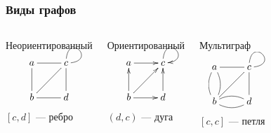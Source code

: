\begin{frame}
    \frametitle{Виды графов}
    \begin{columns}
            \begin{block}{Неориентированный}
                \[
                    {\xymatrix{
                        a \ar@{-}[r] \ar@{-}[d]
                            &c \ar@{-}[d] \ar@{-}@(u,r)[]
                                \\
                        b \ar@{-}[ur] \ar@{-}[r]
                            &d
                    }}
                \]
                $[c,d]$ --- \alert{ребро}
            \end{block}
        
            \begin{block}{Ориентированный}
                \[
                    {\xymatrix{
                        a \ar@{->}[r]
                            &c \ar@{->}@(u,r)[]
                                \\
                        b  \ar@{->}[u] \ar@{->}[ur] \ar@{->}[r]
                            &d \ar@{->}[u]
                    }}
                \]
                $(d,c)$ --- \alert{дуга}
            \end{block}
            \begin{block}{Мультиграф}
            
                \[
                    {\xymatrix{
                        a \ar@{-}[r] \ar@{-}@/^/[d]
                            &c \ar@{-}[d] \ar@{-}@(u,r)[]
                                \\
                        b \ar@{-}[ur] \ar@{-}@/^/[r] \ar@{-}@/^/[u]
                            &d \ar@{-}@/^/[l]
                    }}
                \]
                $[c,c]$ --- \alert{петля}
            \end{block}
    \end{columns}
\end{frame}


